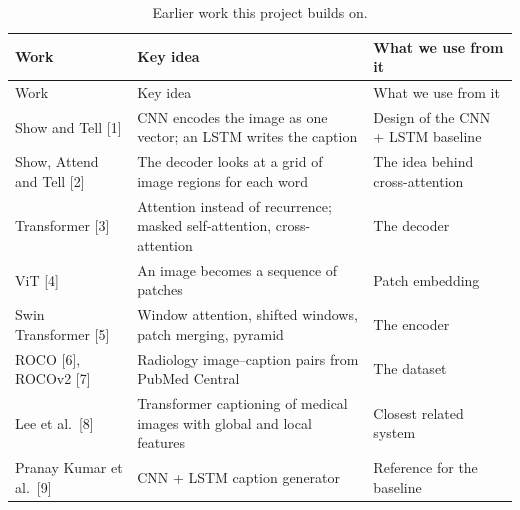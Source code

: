 \begin{longtable}[]{@{}
  >{\raggedright\arraybackslash}p{}
  >{\raggedright\arraybackslash}p{}
  >{\raggedright\arraybackslash}p{}@{}}
\caption{Earlier work this project builds on.}\tabularnewline
\toprule\noalign{}
\begin{minipage}[b]{\linewidth}\raggedright
Work
\end{minipage} & \begin{minipage}[b]{\linewidth}\raggedright
Key idea
\end{minipage} & \begin{minipage}[b]{\linewidth}\raggedright
What we use from it
\end{minipage} \\
\midrule\noalign{}
\endfirsthead
\toprule\noalign{}
\begin{minipage}[b]{\linewidth}\raggedright
Work
\end{minipage} & \begin{minipage}[b]{\linewidth}\raggedright
Key idea
\end{minipage} & \begin{minipage}[b]{\linewidth}\raggedright
What we use from it
\end{minipage} \\
\midrule\noalign{}
\endhead
\bottomrule\noalign{}
\endlastfoot
Show and Tell {[}1{]} & CNN encodes the image as one vector; an LSTM writes the caption & Design of the CNN + LSTM baseline \\
Show, Attend and Tell {[}2{]} & The decoder looks at a grid of image regions for each word & The idea behind cross-attention \\
Transformer {[}3{]} & Attention instead of recurrence; masked self-attention, cross-attention & The decoder \\
ViT {[}4{]} & An image becomes a sequence of patches & Patch embedding \\
Swin Transformer {[}5{]} & Window attention, shifted windows, patch merging, pyramid & The encoder \\
ROCO {[}6{]}, ROCOv2 {[}7{]} & Radiology image--caption pairs from PubMed Central & The dataset \\
Lee et al.~{[}8{]} & Transformer captioning of medical images with global and local features & Closest related system \\
Pranay Kumar et al.~{[}9{]} & CNN + LSTM caption generator & Reference for the baseline \\
\end{longtable}

